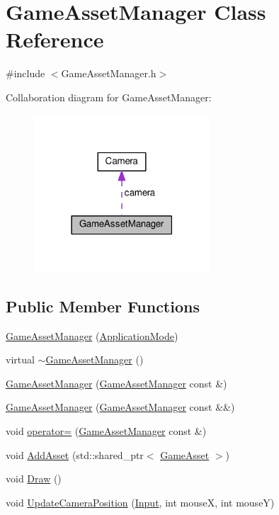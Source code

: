 \hypertarget{class_game_asset_manager}{}\section{Game\+Asset\+Manager Class Reference}
\label{class_game_asset_manager}


{\ttfamily \#include $<$Game\+Asset\+Manager.\+h$>$}



Collaboration diagram for Game\+Asset\+Manager\+:\nopagebreak
\begin{figure}[H]
\begin{center}
\leavevmode
\includegraphics[width=186pt]{class_game_asset_manager__coll__graph}
\end{center}
\end{figure}
\subsection*{Public Member Functions}
\begin{DoxyCompactItemize}
\item 
\hyperlink{class_game_asset_manager_aaa0d58e276cc10ad91a7457085598a71}{Game\+Asset\+Manager} (\hyperlink{common_8h_add86e7c88dd109abea3f708b422f31f0}{Application\+Mode})
\item 
virtual \hyperlink{class_game_asset_manager_a1270bd61ecbcca563f079803e40c9b77}{$\sim$\+Game\+Asset\+Manager} ()
\item 
\hyperlink{class_game_asset_manager_a2c9adcb72faa154c87eadc9bafe5269d}{Game\+Asset\+Manager} (\hyperlink{class_game_asset_manager}{Game\+Asset\+Manager} const \&)
\item 
\hyperlink{class_game_asset_manager_a44f6e2fd6b8ff1dd64e5697f1be7386d}{Game\+Asset\+Manager} (\hyperlink{class_game_asset_manager}{Game\+Asset\+Manager} const \&\&)
\item 
void \hyperlink{class_game_asset_manager_ac72678a4ad5378c685aa6bae84a4e712}{operator=} (\hyperlink{class_game_asset_manager}{Game\+Asset\+Manager} const \&)
\item 
void \hyperlink{class_game_asset_manager_ad3de8ff00d55ba04728b1de8213b2349}{Add\+Asset} (std\+::shared\+\_\+ptr$<$ \hyperlink{class_game_asset}{Game\+Asset} $>$)
\item 
void \hyperlink{class_game_asset_manager_a32837132bd70a9a9ed537323c2d3d886}{Draw} ()
\item 
void \hyperlink{class_game_asset_manager_a2a2eeb7778b2955694cf2dd68f9daefb}{Update\+Camera\+Position} (\hyperlink{common_8h_a080a822f0093973313bd644e517a5090}{Input}, int mouse\+X, int mouse\+Y)
\end{DoxyCompactItemize}
